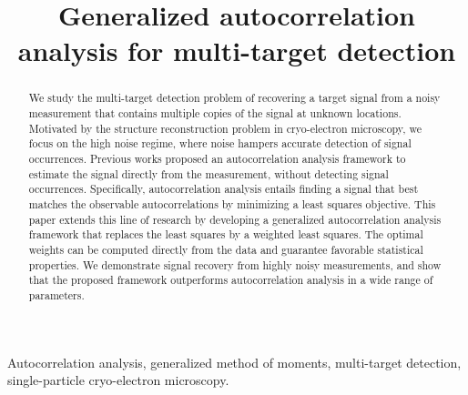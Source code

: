\documentclass{article}
\title{Generalized autocorrelation analysis for multi-target detection}
\begin{document}
\ninept

\setlength{\abovedisplayskip}{3pt}
\setlength{\belowdisplayskip}{3pt}

%
\maketitle
%
\begin{abstract}
We study the multi-target detection problem of recovering a  target signal from a noisy measurement that contains multiple copies of the signal at unknown locations. Motivated by the structure reconstruction problem in cryo-electron microscopy, we focus on the high noise regime, where noise hampers accurate detection of signal occurrences. Previous works proposed an autocorrelation analysis framework to estimate the signal directly from the measurement, without detecting signal occurrences. Specifically, autocorrelation analysis entails finding a signal that best matches the observable autocorrelations by minimizing a least squares objective. This paper extends this line of research by developing a generalized autocorrelation analysis framework that replaces the least squares by a weighted least squares. The optimal weights can be computed directly from the data and guarantee favorable statistical properties. We demonstrate signal recovery from highly noisy measurements, and show that the proposed framework outperforms autocorrelation analysis in a wide range of parameters.
\end{abstract}
%
\begin{keywords}
Autocorrelation analysis, generalized method of moments, multi-target detection, single-particle cryo-electron microscopy.
\end{keywords}
%
\end{document}
